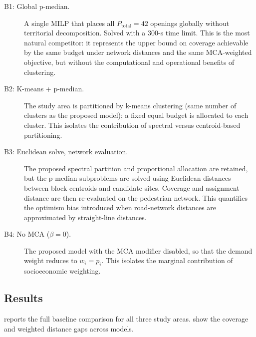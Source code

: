 \begin{description}
  \item[B1: Global p-median.]
        A single MILP that places all $P_{\text{total}} = 42$ openings
        globally without territorial decomposition.
        Solved with a 300-s time limit.
        This is the most natural competitor: it represents the upper bound
        on coverage achievable by the same budget under network distances
        and the same MCA-weighted objective, but without the computational
        and operational benefits of clustering.

  \item[B2: K-means + p-median.]
        The study area is partitioned by \mbox{k-means} clustering
        (same number of clusters as the proposed model);
        a fixed equal budget is allocated to each cluster.
        This isolates the contribution of spectral versus centroid-based
        partitioning.

  \item[B3: Euclidean solve, network evaluation.]
        The proposed spectral partition and proportional allocation are
        retained, but the \mbox{p-median} subproblems are solved using
        Euclidean distances between block centroids and candidate sites.
        Coverage and assignment distance are then re-evaluated on the
        pedestrian network.
        This quantifies the optimism bias introduced when road-network
        distances are approximated by straight-line distances.

  \item[B4: No MCA ($\beta = 0$).]
        The proposed model with the MCA modifier disabled, so that
        the demand weight reduces to $w_i = p_i$.
        This isolates the marginal contribution of socioeconomic weighting.
\end{description}

\subsection{Results}
\label{sec:results}

 reports the full baseline comparison for all three study
areas.  show the coverage
and weighted distance gaps across models.

\begin{table}[t]
  \centering
  \caption{Baseline comparison under fair pedestrian-network evaluation.
           All models use $P_{\text{total}} = 42$ openings.
           Coverage and weighted mean distance are both network-evaluated.}
  \label{tab:baselines}
  
\end{table}

